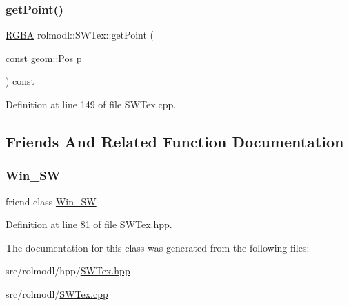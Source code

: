 \subsubsection{\texorpdfstring{getPoint()}{getPoint()}}
{\footnotesize\ttfamily \mbox{\hyperlink{structrolmodl_1_1_r_g_b_a}{R\+G\+BA}} rolmodl\+::\+S\+W\+Tex\+::get\+Point (\begin{DoxyParamCaption}\item[{const \mbox{\hyperlink{structrolmodl_1_1geom_1_1_pos}{geom\+::\+Pos}}}]{p }\end{DoxyParamCaption}) const\hspace{0.3cm}{\ttfamily [noexcept]}}



Definition at line 149 of file S\+W\+Tex.\+cpp.



\subsection{Friends And Related Function Documentation}
\mbox{\label{classrolmodl_1_1_s_w_tex_ad21e0cba1bfeebe2505d45f8c885808a}} 
\subsubsection{\texorpdfstring{Win\_SW}{Win\_SW}}
{\footnotesize\ttfamily friend class \mbox{\hyperlink{classrolmodl_1_1_win___s_w}{Win\+\_\+\+SW}}\hspace{0.3cm}{\ttfamily [friend]}}



Definition at line 81 of file S\+W\+Tex.\+hpp.



The documentation for this class was generated from the following files\+:\begin{DoxyCompactItemize}
\item 
src/rolmodl/hpp/\mbox{\hyperlink{_s_w_tex_8hpp}{S\+W\+Tex.\+hpp}}\item 
src/rolmodl/\mbox{\hyperlink{_s_w_tex_8cpp}{S\+W\+Tex.\+cpp}}\end{DoxyCompactItemize}
